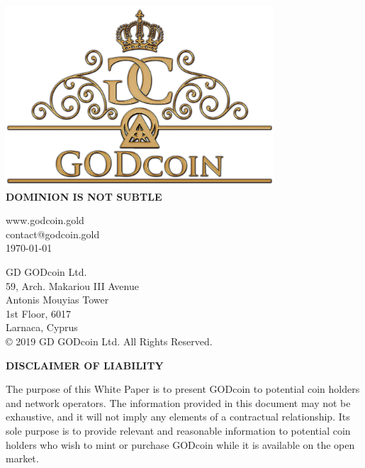 \documentclass[12pt,a4paper]{article}
\begin{document}
  \begin{center}
    \includegraphics[width=100mm]{logo.png}\\
    \Large{\textbf{DOMINION IS NOT SUBTLE}}\\
    \vspace{3mm}

    \vspace{3mm}
    \normalsize{www.godcoin.gold}\\
    \normalsize{contact@godcoin.gold}\\
    \normalsize{\today}
    \vspace{5mm}

    \normalsize{GD GODcoin Ltd.}\\
    \normalsize{59, Arch. Makariou III Avenue}\\
    \normalsize{Antonis Mouyias Tower}\\
    \normalsize{1st Floor, 6017}\\
    \normalsize{Larnaca, Cyprus}\\

    \vspace*{\fill}
    \normalsize{© 2019 GD GODcoin Ltd. All Rights Reserved.}
  \end{center}

  \newpage
  \begin{center}
    \textbf{DISCLAIMER OF LIABILITY}
  \end{center}
  The purpose of this White Paper is to present GODcoin to potential coin
  holders and network operators. The information provided in this document may
  not be exhaustive, and it will not imply any elements of a contractual
  relationship. Its sole purpose is to provide relevant and reasonable
  information to potential coin holders who wish to mint or purchase GODcoin
  while it is available on the open market.\\
\end{document}
